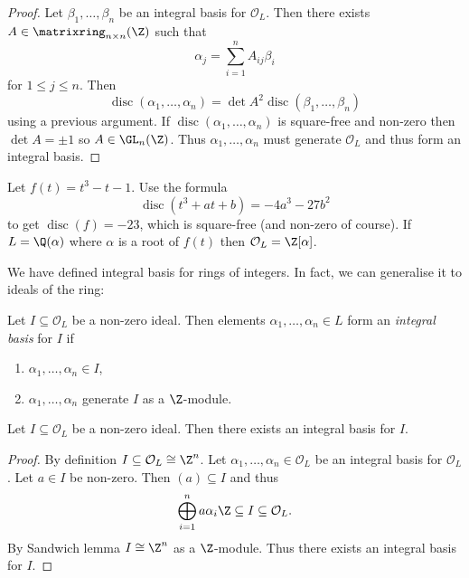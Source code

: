 \documentclass[a4paper]{article}
\renewcommand*{\O}{\mathcal{O}}
\DeclareMathOperator{\disc}{disc}
\begin{document}
\begin{proof}
  Let \(\beta_1, \dots, \beta_n\) be an integral basis for \(\O_L\). Then there exists \(A \in \matrixring_{n \times n}(\Z)\) such that
  \[
    \alpha_j = \sum_{i = 1}^n A_{ij}\beta_i
  \]
  for \(1 \leq j \leq n\). Then
  \[
    \disc(\alpha_1, \dots, \alpha_n) = \det A^2 \disc(\beta_1, \dots, \beta_n)
  \]
  using a previous argument. If \(\disc(\alpha_1, \dots, \alpha_n)\) is square-free and non-zero then \(\det A = \pm 1\) so \(A \in \GL_n(\Z)\). Thus \(\alpha_1, \dots, \alpha_n\) must generate \(\O_L\) and thus form an integral basis.
\end{proof}

\begin{eg}
  Let \(f(t) = t^3 - t - 1\). Use the formula
  \[
    \disc(t^3 + at + b) = -4a^3 - 27b^2
  \]
  to get \(\disc(f) = -23\), which is square-free (and non-zero of course). If \(L = \Q(\alpha)\) where \(\alpha\) is a root of \(f(t)\) then \(\O_L = \Z[\alpha]\).
\end{eg}

We have defined integral basis for rings of integers. In fact, we can generalise it to ideals of the ring:

\begin{definition}
  Let \(I \subseteq \O_L\) be a non-zero ideal. Then elements \(\alpha_1, \dots, \alpha_n \in L\) form an \emph{integral basis} for \(I\) if
  \begin{enumerate}
  \item \(\alpha_1, \dots, \alpha_n \in I\),
  \item \(\alpha_1, \dots, \alpha_n\) generate \(I\) as a \(\Z\)-module.
  \end{enumerate}
\end{definition}

\begin{proposition}
  Let \(I \subseteq \O_L\) be a non-zero ideal. Then there exists an integral basis for \(I\).
\end{proposition}

\begin{proof}
  By definition \(I \subseteq \O_L \cong \Z^n\). Let \(\alpha_1, \dots, \alpha_n \in \O_L\) be an integral basis for \(\O_L\). Let \(a \in I\) be non-zero. Then \((a) \subseteq I\) and thus
  \[
    \bigoplus_{i = 1}^n a\alpha_i\Z \subseteq I \subseteq \O_L.
  \]
  By Sandwich lemma \(I \cong \Z^n\) as a \(\Z\)-module. Thus there exists an integral basis for \(I\).
\end{proof}
\end{document}
